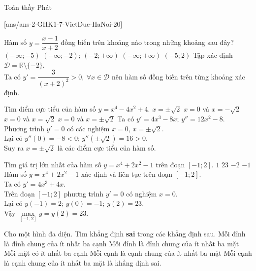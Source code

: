 \begin{name}
    {\tenchude}
    {\tendethi}
    {Toán thầy Phát}
    {\thoigian}
\end{name}
\setcounter{ex}{0}\setcounter{bt}{0}
[ans/ans-2-GHK1-7-VietDuc-HaNoi-20]

\begin{ex}%
 Hàm số $y=\dfrac{x-1}{x+2}$ đồng biến trên khoảng nào trong những khoảng sau đây?
 \choice
  {$(-\infty;-5)$}
  {\True $(-\infty;-2)$; $(-2;+\infty)$}
  {$(-\infty;+\infty)$}
  {$(-5;2)$}
 \loigiai
  {
  Tập xác định $\mathscr{D}=\mathbb{R}\setminus\{-2\}$.\\
  Ta có $y'=\dfrac{3}{(x+2)^2}>0,\ \forall x\in\mathscr{D}$ nên hàm số đồng biến trên từng khoảng xác định. 
  }
\end{ex}

\begin{ex}%
 Tìm điểm cực tiểu của hàm số $y=x^4-4x^2+4$.
 \choice
  {\True $x=\pm \sqrt{2}$}
  {$x=0$ và $x=-\sqrt{2}$}
  {$x=0$ và $x=\sqrt{2}$}
  {$x=0$ và $x=\pm \sqrt{2}$}
 \loigiai
  {
  Ta có $y'=4x^3-8x$; $y''=12x^2-8$.\\
  Phương trình $y'=0$ có các nghiệm $x=0$, $x=\pm \sqrt{2}$.\\
  Lại có $y''(0)=-8<0$; $y''\left(\pm \sqrt{2}\right)=16>0$.\\
  Suy ra $x=\pm \sqrt{2}$ là các điểm cực tiểu của hàm số.
  }
\end{ex}

\begin{ex}%
 Tìm giá trị lớn nhất của hàm số $y=x^4+2x^2-1$ trên đoạn $[-1;2]$.
 \choice
  {$1$}
  {\True $23$}
  {$-2$}
  {$-1$}
 \loigiai
  {
  Hàm số $y=x^4+2x^2-1$ xác định và liên tục trên đoạn $[-1;2]$.\\
  Ta có $y'=4x^3+4x$.\\
  Trên đoạn $\left[-1;2\right]$ phương trình $y'=0$ có nghiệm $x=0$.\\
  Lại có $y(-1)=2$; $y(0)=-1$; $y(2)=23$.\\
  Vậy $\max\limits_{[-1;2]} y=y(2)=23$.
  }
\end{ex}

\begin{ex}%
 Cho một hình đa diện. Tìm khẳng định \textbf{sai} trong các khẳng định sau.
 \choice
  {Mỗi đỉnh là đỉnh chung của ít nhất ba cạnh}
  {Mỗi đỉnh là đỉnh chung của ít nhất ba mặt}
  {Mỗi mặt có ít nhất ba cạnh}
  {\True Mỗi cạnh là cạnh chung của ít nhất ba mặt}
 \loigiai
  {
  Mỗi cạnh là cạnh chung của ít nhất ba mặt là khẳng định sai.
  }
\end{ex}

